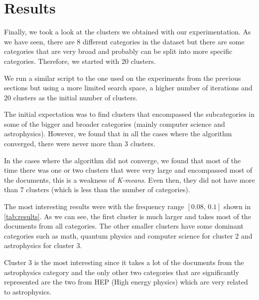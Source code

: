 \section{Results}

Finally, we took a look at the clusters we obtained with our experimentation. As we have seen,
there are 8 different categories in the dataset but there are some categories that are very broad
and probably can be split into more specific categories. Therefore, we started with 20 clusters.

We run a similar script to the one used on the experiments from the previous sections but using
a more limited search space, a higher number of iterations and 20 clusters as the initial
number of clusters.

The initial expectation was to find clusters that encompassed the subcategories in some
of the bigger and broader categories (mainly computer science and astrophysics). However,
we found that in all the cases where the algorithm converged, there were never
more than 3 clusters.

In the cases where the algorithm did not converge, we found that most of the time
there was one or two clusters that were very large and encompassed most of the
documents, this is a weakness of \emph{K-means}. Even then, they did not have more
than 7 clusters (which is less than the number of categories).

The most interesting results were with the frequency range $[0.08,\, 0.1]$ shown
in \ref{tab:results}. As we can see, the first cluster is much larger and takes
most of the documents from all categories. The other smaller clusters have some dominant categories
such as math, quantum physics and computer science for cluster 2 and astrophysics for cluster 3.

Cluster 3 is the most interesting since it takes a lot of the documents from the astrophysics category
and the only other two categories that are significantly represented are the two from HEP (High energy
physics) which are very related to astrophysics.

